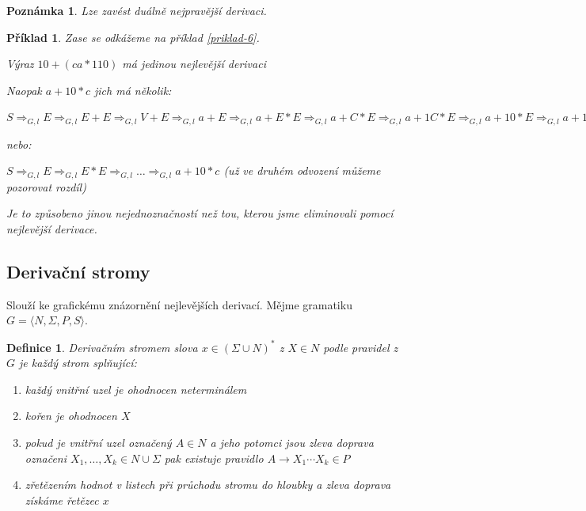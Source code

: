 \documentclass[10pt, a4paper, titlepage]{article}
\theoremstyle{note}
\newtheorem{definice}{Definice}
\newtheorem{priklad}{Příklad}
\newtheorem{poznamka}{Poznámka}
\begin{document}
\begin{poznamka}
Lze zavést duálně nejpravější derivaci.
\end{poznamka}

\begin{priklad}
Zase se odkážeme na příklad \ref{priklad-6}.

Výraz $10+(ca*110)$ má jedinou nejlevější derivaci

Naopak $a+10*c$ jich má několik:

$S \Rightarrow_{G,l} E \Rightarrow_{G,l} E+E \Rightarrow_{G,l} V+E \Rightarrow_{G,l} a+E \Rightarrow_{G,l} a+E*E \Rightarrow_{G,l} a+C*E \Rightarrow_{G,l} a+1C*E \Rightarrow_{G,l} a+10*E \Rightarrow_{G,l} a+10*V \Rightarrow_{G,l} a+10*c$

nebo:

$S \Rightarrow_{G,l} E \Rightarrow_{G,l} E*E \Rightarrow_{G,l} \ldots \Rightarrow_{G,l} a+10*c$ (už ve druhém odvození můžeme pozorovat rozdíl)

Je to způsobeno jinou nejednoznačností než tou, kterou jsme eliminovali pomocí nejlevější derivace.
\end{priklad}

\subsection{Derivační stromy}

Slouží ke grafickému znázornění nejlevějších derivací. Mějme gramatiku $G = \langle N,\Sigma,P,S \rangle$.

\begin{definice}
Derivačním stromem slova $x \in (\Sigma \cup N)^*$ z $X \in N$ podle pravidel z $G$ je každý strom splňující:
\begin{enumerate}
\item 
každý vnitřní uzel je ohodnocen neterminálem
\item
kořen je ohodnocen $X$
\item
pokud je vnitřní uzel označený $A\in N $ a jeho potomci jsou zleva doprava označeni $X_1,\ldots,X_k \in N\cup \Sigma$ pak existuje pravidlo $A \rightarrow X_1 \cdots X_k \in P$
\item
zřetězením hodnot v listech při průchodu stromu do hloubky a zleva doprava získáme řetězec $x$
\end{enumerate}
\end{definice}
\end{document}
